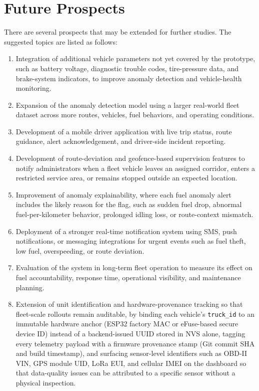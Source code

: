 \section{Future Prospects}
\label{sec:concluding_future_prospects}

There are several prospects that may be extended for further studies. The suggested topics are listed as follows:

\begin{enumerate}
  \item Integration of additional vehicle parameters not yet covered by the prototype, such as battery voltage, diagnostic trouble codes, tire-pressure data, and brake-system indicators, to improve anomaly detection and vehicle-health monitoring.

  \item Expansion of the anomaly detection model using a larger real-world fleet dataset across more routes, vehicles, fuel behaviors, and operating conditions.

  \item Development of a mobile driver application with live trip status, route guidance, alert acknowledgement, and driver-side incident reporting.

  \item Development of route-deviation and geofence-based supervision features to notify administrators when a fleet vehicle leaves an assigned corridor, enters a restricted service area, or remains stopped outside an expected location.

  \item Improvement of anomaly explainability, where each fuel anomaly alert includes the likely reason for the flag, such as sudden fuel drop, abnormal fuel-per-kilometer behavior, prolonged idling loss, or route-context mismatch.

  \item Deployment of a stronger real-time notification system using SMS, push notifications, or messaging integrations for urgent events such as fuel theft, low fuel, overspeeding, or route deviation.

  \item Evaluation of the system in long-term fleet operation to measure its effect on fuel accountability, response time, operational visibility, and maintenance planning.

  \item Extension of unit identification and hardware-provenance tracking so that fleet-scale rollouts remain auditable, by binding each vehicle's \texttt{truck\_id} to an immutable hardware anchor (ESP32 factory MAC or eFuse-based secure device ID) instead of a backend-issued UUID stored in NVS alone, tagging every telemetry payload with a firmware provenance stamp (Git commit SHA and build timestamp), and surfacing sensor-level identifiers such as OBD-II VIN, GPS module UID, LoRa EUI, and cellular IMEI on the dashboard so that data-quality issues can be attributed to a specific sensor without a physical inspection.
\end{enumerate}

